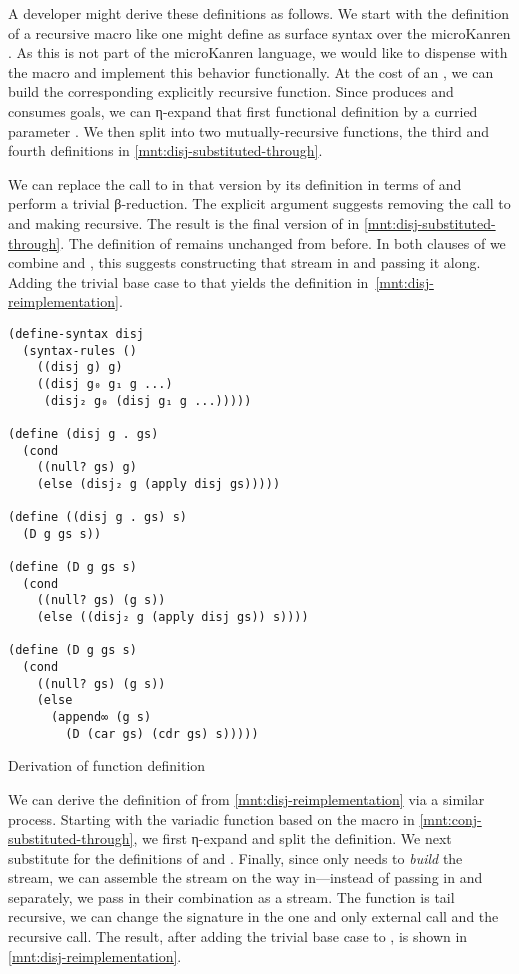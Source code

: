 \documentclass[sigplan,balance,pbalance,natbib=false]{acmart}
\begin{document}
A developer might derive these definitions as follows. We start with
the definition of a recursive  macro like one might
define as surface syntax over the microKanren . As
this is not part of the microKanren language, we would like to
dispense with the macro and implement this behavior functionally. At
the cost of an , we can build the corresponding
explicitly recursive  function.
Since  produces and consumes goals, we can η-expand
that first functional definition by a curried
parameter . We then split  into two
mutually-recursive functions, the third and fourth definitions in
\cref{mnt:disj-substituted-through}.

We can replace the call to  in that version by its
definition in terms of  and perform a trivial
β-reduction. The explicit  argument suggests removing
the call to  and making  recursive.
The result is the final version of  in
\cref{mnt:disj-substituted-through}. The definition
of  remains unchanged from before. In both clauses
of  we combine  and , this
suggests constructing that stream in  and passing it
along. Adding the trivial base case to that  yields
the definition in~\cref{mnt:disj-reimplementation}.

\begin{listing}
\begin{verbatim}
(define-syntax disj
  (syntax-rules ()
    ((disj g) g)
    ((disj g₀ g₁ g ...)
     (disj₂ g₀ (disj g₁ g ...)))))

(define (disj g . gs)
  (cond
    ((null? gs) g)
    (else (disj₂ g (apply disj gs)))))

(define ((disj g . gs) s)
  (D g gs s))

(define (D g gs s)
  (cond
    ((null? gs) (g s))
    (else ((disj₂ g (apply disj gs)) s))))

(define (D g gs s)
  (cond
    ((null? gs) (g s))
    (else
      (append∞ (g s)
        (D (car gs) (cdr gs) s)))))
\end{verbatim}
  \caption{Derivation of  function definition}\label{mnt:disj-substituted-through}
\end{listing}

We can derive the definition of  from
\cref{mnt:disj-reimplementation} via a similar process. Starting with
the variadic function based on the macro in
\cref{mnt:conj-substituted-through}, we first η-expand and split the
definition. We next substitute for the definitions
of  and . Finally,
since  only needs  to \emph{build} the
stream, we can assemble the stream on the way in---instead of passing
in  and  separately, we pass in their
combination as a stream. The function is tail recursive, we can change
the signature in the one and only external call and the recursive
call. The result, after adding the trivial base case
to , is shown in \cref{mnt:disj-reimplementation}.
\end{document}
